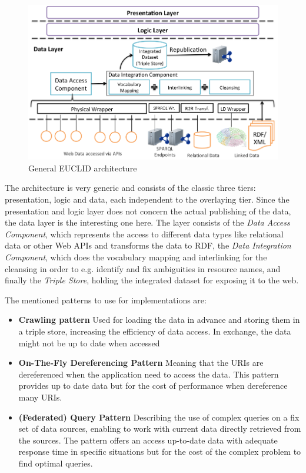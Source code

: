 \begin{figure}[ht]
	\centering
\includegraphics[width=1\textwidth]{img/euclid_architecture.png}
	\caption{General EUCLID architecture}
	\label{euclid_architecture}
\end{figure}

The architecture is very generic and consists of the classic three tiers: presentation, logic and data, each independent to the overlaying tier. Since the presentation and logic layer does not concern the actual publishing of the data, the data layer is the interesting one here. The layer consists of the \emph{Data Access Component}, which represents the access to different data types like relational data or other Web APIs and transforms the data to RDF, the \emph{Data Integration Component}, which does the vocabulary mapping and interlinking for the cleansing in order to e.g. identify and fix ambiguities in resource names, and finally the \emph{Triple Store}, holding the integrated dataset for exposing it to the web.

The mentioned patterns to use for implementations are:

\begin{itemize}
\item \textbf{Crawling pattern}
Used for loading the data in advance and storing them in a triple store, increasing the efficiency of data access. In exchange, the data might not be up to date when accessed
\item \textbf{On-The-Fly Dereferencing Pattern}
Meaning that the URIs are dereferenced when the application need to access the data. This pattern provides up to date data but for the cost of performance when dereference many URIs.
\item \textbf{(Federated) Query Pattern}
Describing the use of complex queries on a fix set of data sources, enabling to work with current data directly retrieved from the sources. The pattern offers an access up-to-date data with adequate response time in specific situations but for the cost of the complex problem to find optimal queries.
\end{itemize}

